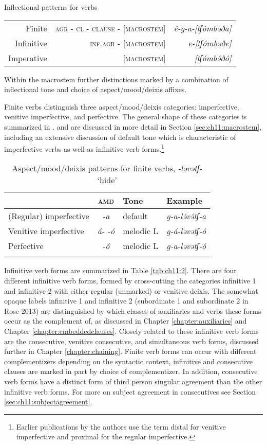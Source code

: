 \ea Inflectional patterns for verbs \label{ex:verbs:inflpattern}
\begin{tabular}[t]{rrr}
Finite 		& \textsc{agr} - \textsc{cl} - \textsc{clause} - [\textsc{macrostem}] & \textit{é-g-a-[tʃómbəða]} \\
Infinitive 	& \textsc{inf.agr} - [\textsc{macrostem}] 	& \textit{e-[tʃómbəðe]} \\
Imperative 	& [\textsc{macrostem}] 									& \textit{[tʃómbə́ðó]} \\	
\end{tabular} \z 
Within the macrostem further distinctions marked by a combination of inflectional tone and choice of aspect/mood/deixis affixes.

Finite verbs distinguish three aspect/mood/deixis categories: imperfective, venitive imperfective, and perfective. The general shape of these categories is summarized in .  and are discussed in more detail in Section \ref{sec:ch11:macrostem}, including an extensive discussion of default tone which is characteristic of imperfective verbs as well as infinitive verb forms.\footnote{Earlier publications by the authors use the term distal for venitive imperfective and proximal for the regular imperfective.}

\begin{table}
\begin{tabular}[t]{lcll}
\lsptoprule
						&  \textsc{amd}  		& Tone 			& Example \\
\midrule
(Regular) imperfective 	& \textit{-a} 	& default		& \textit{g-a-lə́və́tʃ-a} \\
Venitive imperfective 	& \textit{á- -ó} & melodic L 	& \textit{g-á-ləvətʃ-ó} \\	
Perfective 				& \textit{-ó} 	& melodic L 	& \textit{g-a-ləvətʃ-ó}  \\
\lspbottomrule
\end{tabular}	
\caption{Aspect/mood/deixis patterns for finite verbs, \textit{-ləvətʃ-} `hide'}
\label{tab:ch11:1}
\end{table}


Infinitive verb forms are summarized in Table \ref{tab:ch11:2}. There are four different infinitive verb forms, formed by cross-cutting the categories infinitive 1 and infinitive 2 with either regular (unmarked) or venitive deixis. The somewhat opaque labels infinitive 1 and infinitive 2 (subordinate 1 and subordinate 2 in Rose 2013) are distinguished by which classes of auxiliaries and verbs these forms occur as the complement of, as discussed in Chapter \ref{chapter:auxiliaries} and Chapter \ref{chapter:embeddedclauses}. Closely related to these infinitive verb forms are the consecutive, venitive consecutive, and simultaneous verb forms, discussed further in Chapter \ref{chapter:chaining}. Finite verb forms can occur with different complementizers depending on the syntactic context, infinitive and consecutive clauses are marked in part by choice of complementizer. In addition, consecutive verb forms have a distinct form of third person singular agreement than the other infinitive verb forms. For more on subject agreement in consecutives see Section \ref{sec:ch11:subjectagreement}.

